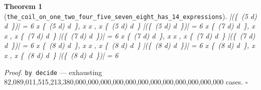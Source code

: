 \documentclass[11pt]{article}
\newtheorem{theorem}{Theorem}[section]
\begin{document}
\begin{theorem}[\texttt{the\_coil\_on\_one\_two\_four\_five\_seven\_eight\_has\_14\_expressions}]
\left|\left(\{\, \mathopen{}\left(5 \cdot d\right) \mid d \in [1,\,2,\,4,\,5,\,7,\,8] \,\}\right)\right| = 6 \land \forall x \in \{\, \mathopen{}\left(5 \cdot d\right) \mid d \in [1,\,2,\,4,\,8,\,7,\,5] \,\},\; x \in [1,\,2,\,4,\,5,\,7,\,8] \land \forall x \in [1,\,2,\,4,\,5,\,7,\,8],\; x \in \{\, \mathopen{}\left(5 \cdot d\right) \mid d \in [1,\,2,\,4,\,8,\,7,\,5] \,\} \land \left|\left(\{\, \mathopen{}\left(5 \cdot d\right) \mid d \in [1,\,2,\,4,\,8,\,7,\,5] \,\}\right)\right| = 6 \land \forall x \in \{\, \mathopen{}\left(7 \cdot d\right) \mid d \in [1,\,2,\,4,\,5,\,7,\,8] \,\},\; x \in [1,\,2,\,4,\,5,\,7,\,8] \land \forall x \in [1,\,2,\,4,\,5,\,7,\,8],\; x \in \{\, \mathopen{}\left(7 \cdot d\right) \mid d \in [1,\,2,\,4,\,5,\,7,\,8] \,\} \land \left|\left(\{\, \mathopen{}\left(7 \cdot d\right) \mid d \in [1,\,2,\,4,\,5,\,7,\,8] \,\}\right)\right| = 6 \land \forall x \in \{\, \mathopen{}\left(7 \cdot d\right) \mid d \in [1,\,2,\,4,\,8,\,7,\,5] \,\},\; x \in [1,\,2,\,4,\,5,\,7,\,8] \land \forall x \in [1,\,2,\,4,\,5,\,7,\,8],\; x \in \{\, \mathopen{}\left(7 \cdot d\right) \mid d \in [1,\,2,\,4,\,8,\,7,\,5] \,\} \land \left|\left(\{\, \mathopen{}\left(7 \cdot d\right) \mid d \in [1,\,2,\,4,\,8,\,7,\,5] \,\}\right)\right| = 6 \land \forall x \in \{\, \mathopen{}\left(8 \cdot d\right) \mid d \in [1,\,2,\,4,\,5,\,7,\,8] \,\},\; x \in [1,\,2,\,4,\,5,\,7,\,8] \land \forall x \in [1,\,2,\,4,\,5,\,7,\,8],\; x \in \{\, \mathopen{}\left(8 \cdot d\right) \mid d \in [1,\,2,\,4,\,5,\,7,\,8] \,\} \land \left|\left(\{\, \mathopen{}\left(8 \cdot d\right) \mid d \in [1,\,2,\,4,\,5,\,7,\,8] \,\}\right)\right| = 6 \land \forall x \in \{\, \mathopen{}\left(8 \cdot d\right) \mid d \in [1,\,2,\,4,\,8,\,7,\,5] \,\},\; x \in [1,\,2,\,4,\,5,\,7,\,8] \land \forall x \in [1,\,2,\,4,\,5,\,7,\,8],\; x \in \{\, \mathopen{}\left(8 \cdot d\right) \mid d \in [1,\,2,\,4,\,8,\,7,\,5] \,\} \land \left|\left(\{\, \mathopen{}\left(8 \cdot d\right) \mid d \in [1,\,2,\,4,\,8,\,7,\,5] \,\}\right)\right| = 6 \]
\end{theorem}
\noindent\emph{Proof.} \texttt{by decide} --- exhausting 82,089,011,515,213,380,000,000,000,000,000,000,000,000,000,000,000,000 cases. \hfill$\square$
\end{document}

